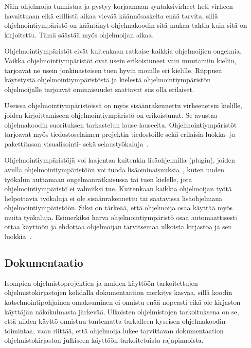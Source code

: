\documentclass[finnish]{tktltiki2}
\theoremstyle{definition}
\theoremstyle{remark}
\begin{document}
Näin ohjelmoija tunnistaa ja pystyy korjaamaan syntaksivirheet heti virheen havaittuaan eikä erillistä aikaa vievää käännösaskelta enää tarvita, sillä ohjelmointiympäristö on kääntänyt ohjelmakoodin sitä mukaa tahtia kuin sitä on kirjoitettu. Tämä säästää myös ohjelmoijan aikaa.

Ohjelmointiympäristöt eivät kuitenkaan ratkaise kaikkia ohjelmoijien ongelmia. Vaikka ohjelmointiympäristöt ovat usein erikoistuneet vain muutamiin kieliin, tarjoavat ne usein jonkinasteisen tuen hyvin monille eri kielille. Riippuen käytetystä ohjelmointiympäristöstä ja kielestä ohjelmointiympäristön ohjelmoijalle tarjoavat ominaisuudet saattavat siis olla erilaiset.

Useissa ohjelmointiympäristöissä on myös sisäänrakennettu virheenetsin kielille, joiden kirjoittamiseen ohjelmointiympäristö on erikoistunut. Se avustaa ohjelmakoodin suorituksen tarkastelun lause lauseelta. Ohjelmointiympäristöt tarjoavat myös tiedostoselaimen projektin tiedostoille sekä erilaisia luokka- ja pakettitason visualisointi- sekä selaustyökaluja~\cite{eclipse-ide}.

Ohjelmointiympäristöjä voi laajentaa kuitenkin lisäohjelmilla (plugin), joiden avulla ohjelmointiympäristöön voi tuoda lisäominaisuuksia~\cite{eclipse-ide}, kuten uuden työkalun auttamaan ongelmanratkaisussa tai tuen kielelle, jota ohjelmointiympäristö ei valmiiksi tue. Kuitenkaan kaikkia ohjelmoijan työtä helpottavia työkaluja ei ole sisäänrakennettu tai saatavissa lisäohjelmana ohjelmointiympäristöön. Siksi on tärkeää, että ohjelmoija osaa käyttää myös muita työkaluja. Esimerkiksi harva ohjelmointiympäristö osaa automaattisesti ottaa käyttöön ja
ehdottaa ohjelmoijan tarvitsemaa ulkoista kirjastoa ja sen luokkia~\cite{jungloid-mining}.

\subsection{Dokumentaatio}

Isompien ohjelmistoprojektien ja muiden käyttöön tarkoitettujen ohjelmistokirjastojen kohdalla dokumentaation merkitys kasvaa, sillä koodin katselmointipohjainen omaksuminen ei onnistu enää nopeasti eikä ole kirjaston käyttäjän näkökulmasta järkevää. Ulkoisten ohjelmistojen tarkoituksena on se, että niiden käyttö onnistuu tuntematta tarkalleen kyseisen ohjelmakoodin toimintaa, vaan riittää, että ohjelmoija lukee tarvittavan dokumentaation ohjelmistokirjaston julkiseen käyttöön tarkoitetuista rajapinnoista.
\end{document}
